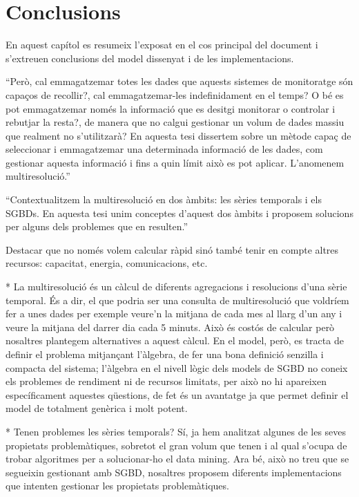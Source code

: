 \chapter{Conclusions}
\label{sec:conclusions}



En aquest capítol es resumeix l'exposat en el cos principal del
document i s'extreuen conclusions del model dissenyat i de les
implementacions.


``Però, cal emmagatzemar totes les dades que aquests sistemes de
monitoratge són capaços de recollir?, cal emmagatzemar-les
indefinidament en el temps? O bé es pot emmagatzemar només la
informació que es desitgi monitorar o controlar i rebutjar la resta?,
de manera que no calgui gestionar un volum de dades massiu que
realment no s'utilitzarà? En aquesta tesi dissertem sobre un mètode
capaç de seleccionar i emmagatzemar una determinada informació de les
dades, com gestionar aquesta informació i fins a quin límit això es pot
aplicar. L'anomenem multiresolució.''

``Contextualitzem la multiresolució en dos àmbits: les sèries temporals
i els \glspl{SGBD}. En aquesta tesi unim conceptes d'aquest dos àmbits
i proposem solucions per alguns dels problemes que en resulten.''


Destacar que no només volem calcular ràpid sinó també tenir en compte altres recursos: capacitat, energia, comunicacions, etc.


\todo{}
* La multiresolució és un càlcul de diferents agregacions i resolucions d'una sèrie temporal. És a dir, el que podria ser una consulta de multiresolució que voldríem fer a unes dades per exemple veure'n la mitjana de cada mes al llarg d'un any i veure la mitjana del darrer dia cada 5 minuts. Això és costós de calcular però nosaltres plantegem alternatives a aquest càlcul. En el model, però, es tracta de definir el problema mitjançant l'àlgebra, de fer una bona definició senzilla i compacta del sistema; l'àlgebra en el nivell lògic dels models de SGBD no coneix els problemes de rendiment ni de recursos limitats, per això no hi apareixen específicament aquestes qüestions, de fet és un avantatge ja que permet definir el model de totalment genèrica i molt potent.

* Tenen problemes les sèries temporals? Sí, ja hem analitzat algunes de les seves propietats problemàtiques, sobretot el gran volum que tenen i al qual s'ocupa de trobar algoritmes per a solucionar-ho el data mining. Ara bé, això no treu que se segueixin gestionant amb SGBD, nosaltres proposem diferents implementacions que intenten gestionar les propietats problemàtiques.


